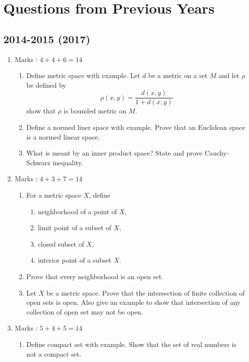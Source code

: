 \documentclass[../main-sheet.tex]{subfiles}
\begin{document}
\chapter*{Questions from Previous Years}
\section*{2014-2015 (2017)}
\begin{enumerate}
    \item Marks : $ 4+4+6=14 $
          \begin{enumerate}
              \item Define metric space with example. Let $ d$ be a metric on a set $ M $ and let $ \rho $ be defined by 
              \[
                  \rho(x,y)=\frac{d(x,y)}{1+d(x,y)}
              \]
              show that $ \rho  $ is bounded metric on $ M $.
              \item Define a normed liner space with example. Prove that an Euclidean space is a normed linear space.
              \item What is meant by an inner product space? State and prove Cauchy-Schwarz inequality.
        \end{enumerate}
    \item Marks : $ 4+3+7=14 $
        \begin{enumerate}
            \item For a metric space $ X $, define 
            \begin{enumerate}
                \item neighborhood of a point of $ X $,
                \item limit point of a subset of $ X $,
                \item closed subset of $ X $,
                \item interior point of a subset $ X $.
            \end{enumerate}
            \item Prove that every neighborhood is an open set.
            \item Let $ X $ be a metric space. Prove that the intersection of finite collection of open sets is open. Also give an example to show that intersection of any collection of open set may not be open.
          \end{enumerate}
    \item Marks : $ 5+4+5=14 $
          \begin{enumerate}
              \item Define compact set with example. Show that the set of real numbers is not a compact set.

\end{enumerate}
\end{enumerate}
\end{document}

